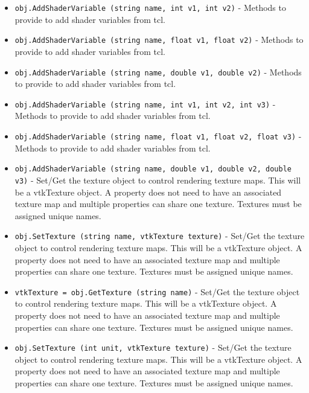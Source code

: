 \begin{itemize}
\item  \verb|obj.AddShaderVariable (string name, int v1, int v2)| -  Methods to provide to add shader variables from tcl.

\item  \verb|obj.AddShaderVariable (string name, float v1, float v2)| -  Methods to provide to add shader variables from tcl.

\item  \verb|obj.AddShaderVariable (string name, double v1, double v2)| -  Methods to provide to add shader variables from tcl.

\item  \verb|obj.AddShaderVariable (string name, int v1, int v2, int v3)| -  Methods to provide to add shader variables from tcl.

\item  \verb|obj.AddShaderVariable (string name, float v1, float v2, float v3)| -  Methods to provide to add shader variables from tcl.

\item  \verb|obj.AddShaderVariable (string name, double v1, double v2, double v3)| -  Set/Get the texture object to control rendering texture maps.  This will
 be a vtkTexture object. A property does not need to have an associated
 texture map and multiple properties can share one texture. Textures
 must be assigned unique names.

\item  \verb|obj.SetTexture (string name, vtkTexture texture)| -  Set/Get the texture object to control rendering texture maps.  This will
 be a vtkTexture object. A property does not need to have an associated
 texture map and multiple properties can share one texture. Textures
 must be assigned unique names.

\item  \verb|vtkTexture = obj.GetTexture (string name)| -  Set/Get the texture object to control rendering texture maps.  This will
 be a vtkTexture object. A property does not need to have an associated
 texture map and multiple properties can share one texture. Textures
 must be assigned unique names.

\item  \verb|obj.SetTexture (int unit, vtkTexture texture)| -  Set/Get the texture object to control rendering texture maps.  This will
 be a vtkTexture object. A property does not need to have an associated
 texture map and multiple properties can share one texture. Textures
 must be assigned unique names.


\end{itemize}
